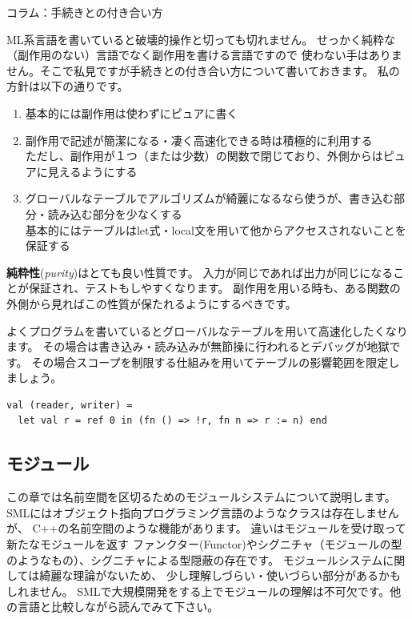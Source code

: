 \documentclass[11pt,a4paper]{jarticle}
\begin{document}
\begin{itembox}[l]{コラム：手続きとの付き合い方}

ML系言語を書いていると破壊的操作と切っても切れません。
せっかく純粋な（副作用のない）言語でなく副作用を書ける言語ですので
使わない手はありません。そこで私見ですが手続きとの付き合い方について書いておきます。
私の方針は以下の通りです。

\begin{enumerate}
\item 基本的には副作用は使わずにピュアに書く
\item 副作用で記述が簡潔になる・凄く高速化できる時は積極的に利用する\\
  ただし、副作用が１つ（または少数）の関数で閉じており、外側からはピュアに見えるようにする
\item グローバルなテーブルでアルゴリズムが綺麗になるなら使うが、書き込む部分・読み込む部分を少なくする\\
  基本的にはテーブルはlet式・local文を用いて他からアクセスされないことを保証する
\end{enumerate}

\textbf{純粋性}(\textit{purity})はとても良い性質です。
入力が同じであれば出力が同じになることが保証され、テストもしやすくなります。
副作用を用いる時も、ある関数の外側から見ればこの性質が保たれるようにするべきです。

よくプログラムを書いているとグローバルなテーブルを用いて高速化したくなります。
その場合は書き込み・読み込みが無節操に行われるとデバッグが地獄です。
その場合スコープを制限する仕組みを用いてテーブルの影響範囲を限定しましょう。

\begin{lstlisting}[caption=let式でリファレンスが他からアクセスされないことを保証する]
val (reader, writer) =
  let val r = ref 0 in (fn () => !r, fn n => r := n) end
\end{lstlisting}
\end{itembox}

\subsection{モジュール}

この章では名前空間を区切るためのモジュールシステムについて説明します。
SMLにはオブジェクト指向プログラミング言語のようなクラスは存在しませんが、
C++の名前空間のような機能があります。
違いはモジュールを受け取って新たなモジュールを返す
ファンクター(Functor)やシグニチャ（モジュールの型のようなもの）、シグニチャによる型隠蔽の存在です。
モジュールシステムに関しては綺麗な理論がないため、
少し理解しづらい・使いづらい部分があるかもしれません。
SMLで大規模開発をする上でモジュールの理解は不可欠です。他の言語と比較しながら読んでみて下さい。
\end{document}
